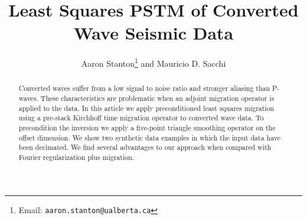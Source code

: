 \author{Aaron Stanton\footnote{Email: \tt{aaron.stanton@ualberta.ca}}
and Mauricio D. Sacchi }
\title
{Least Squares PSTM of Converted Wave Seismic Data}

\maketitle
\begin{abstract}
Converted waves suffer from a low signal to noise ratio and stronger aliasing than P-waves. These characteristics are problematic when an adjoint migration operator is applied to the data. In this article we apply preconditioned least squares migration using a pre-stack Kirchhoff time migration operator to converted wave data. To precondition the inversion we apply a five-point triangle smoothing operator on the offset dimension. We show two synthetic data examples in which the input data have been decimated. We find several advantages to our approach when compared with Fourier regularization plus migration.    
\end{abstract}

